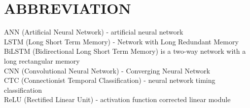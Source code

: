 \chapter*{ABBREVIATION}							%


\noindent ANN (Artificial Neural Network) - artificial neural network \\
LSTM (Long Short Term Memory) - Network with Long Redundant Memory \\
BiLSTM (Bidirectional Long Short Term Memory) is a two-way network with a long rectangular memory \\
CNN (Convolutional Neural Network) - Converging Neural Network \\
CTC (Connectionist Temporal Classification) - neural network timing classification \\
ReLU (Rectified Linear Unit) - activation function corrected linear module \\

